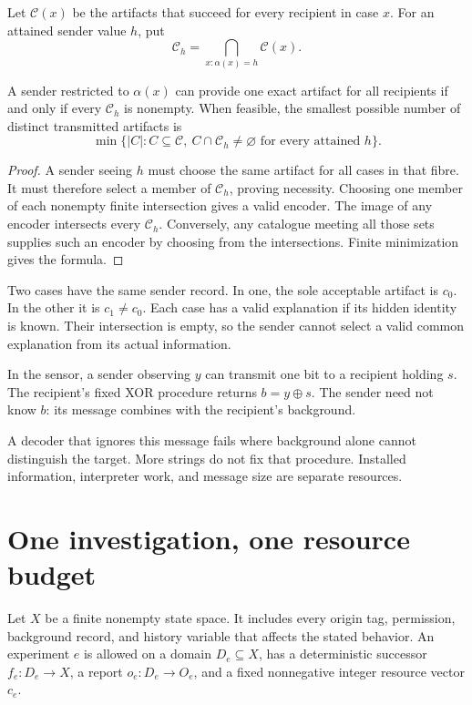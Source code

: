 Let $\mathcal C(x)$ be the artifacts that succeed for every recipient in case $x$. For an attained sender value $h$, put
\[
\mathcal C_h=\bigcap_{x:\alpha(x)=h}\mathcal C(x).
\]

\begin{Coretheorem}\label{Core:r:recipient}
A sender restricted to $\alpha(x)$ can provide one exact artifact for all recipients if and only if every $\mathcal C_h$ is nonempty. When feasible, the smallest possible number of distinct transmitted artifacts is
\[
\min\{|C|:C\subseteq\mathcal C,\ C\cap\mathcal C_h\ne\varnothing
\text{ for every attained }h\}.
\]
\end{Coretheorem}
\begin{proof}
A sender seeing $h$ must choose the same artifact for all cases in that fibre. It must therefore select a member of $\mathcal C_h$, proving necessity. Choosing one member of each nonempty finite intersection gives a valid encoder. The image of any encoder intersects every $\mathcal C_h$. Conversely, any catalogue meeting all those sets supplies such an encoder by choosing from the intersections. Finite minimization gives the formula.
\end{proof}

\begin{Corecounterexample}\label{Core:ce:message}
Two cases have the same sender record. In one, the sole acceptable artifact is $c_0$. In the other it is $c_1\ne c_0$. Each case has a valid explanation if its hidden identity is known. Their intersection is empty, so the sender cannot select a valid common explanation from its actual information.
\end{Corecounterexample}

In the sensor, a sender observing $y$ can transmit one bit to a recipient holding $s$. The recipient's fixed XOR procedure returns $b=y\oplus s$. The sender need not know $b$: its message combines with the recipient's background.

A decoder that ignores this message fails where background alone cannot distinguish the target. More strings do not fix that procedure. Installed information, interpreter work, and message size are separate resources.


\chapter{One investigation, one resource budget}\label{Core:book:chapter-5}
\setcounter{section}{0}\label{Core:ch:inquiry}
Let $X$ be a finite nonempty state space. It includes every origin tag, permission, background record, and history variable that affects the stated behavior. An experiment $e$ is allowed on a domain $D_e\subseteq X$, has a deterministic successor $f_e:D_e\to X$, a report $o_e:D_e\to O_e$, and a fixed nonnegative integer resource vector $c_e$.

